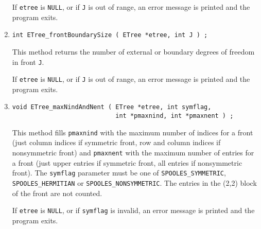 \begin{enumerate}
If {\tt etree} is {\tt NULL},
or if {\tt J} is out of range, 
an error message is printed and the program exits.
\item
\begin{verbatim}
int ETree_frontBoundarySize ( ETree *etree, int J ) ;
\end{verbatim}
This method returns the number of external or
boundary degrees of freedom in front {\tt J}.
\par {}
If {\tt etree} is {\tt NULL},
or if {\tt J} is out of range, 
an error message is printed and the program exits.
\item
\begin{verbatim}
void ETree_maxNindAndNent ( ETree *etree, int symflag,
                            int *pmaxnind, int *pmaxnent ) ;
\end{verbatim}
This method fills 
{\tt *pmaxnind} with the maximum number of
indices for a front (just column indices if symmetric front,
row and column indices if nonsymmetric front)
and {\tt *pmaxnent} with the maximum number of
entries for a front (just upper entries if symmetric front,
all entries if nonsymmetric front).
The {\tt symflag} parameter must be one of {\tt SPOOLES\_SYMMETRIC},
{\tt SPOOLES\_HERMITIAN} or {\tt SPOOLES\_NONSYMMETRIC}.
The entries in the (2,2) block of the front are not counted.
\par {}
If {\tt etree} is {\tt NULL},
or if {\tt symflag} is invalid,
an error message is printed and the program exits.
\end{enumerate}
\par
